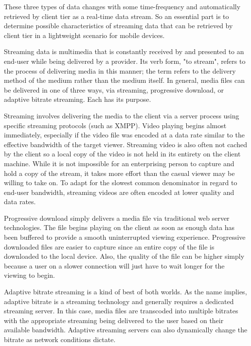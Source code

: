    These three types of data changes with some time-frequency and automatically retrieved by client tier as a real-time data stream. So an essential part is to determine possible characteristics of streaming data that can be retrieved by client tier in a lightweight scenario for mobile devices.

    Streaming data is multimedia that is constantly received by and presented to an end-user while being delivered by a provider. Its verb form, "to stream", refers to the process of delivering media in this manner; the term refers to the delivery method of the medium rather than the medium itself. In general, media files can be delivered in one of three ways, via streaming, progressive download, or adaptive bitrate streaming.  Each has its purpose.

    Streaming involves delivering the media to the client via a server process using specific streaming protocols (such as XMPP).  Video playing begins almost immediately, especially if the video file was encoded at a data rate similar to the effective bandwidth of the target viewer.  Streaming video is also often not cached by the client so a local copy of the video is not held in its entirety on the client machine.  While it is not impossible for an enterprising person to capture and hold a copy of the stream, it takes more effort than the casual viewer may be willing to take on.  To adapt for the slowest common denominator in regard to end-user bandwidth, streaming videos are often encoded at lower quality and data rates.
 
    Progressive download simply delivers a media file via traditional web server technologies.  The file begins playing on the client as soon as enough data has been buffered to provide a smooth uninterrupted viewing experience.  Progressive downloaded files are easier to capture since an entire copy of the file is downloaded to the local device.  Also, the quality of the file can be higher simply because a user on a slower connection will just have to wait longer for the viewing to begin.
  
    Adaptive bitrate streaming is a kind of best of both worlds. As the name implies, adaptive bitrate is a streaming technology and generally requires a dedicated streaming server. In this case, media files are transcoded into multiple bitrates with the appropriate streaming being delivered to the user based on their available bandwidth.  Adaptive streaming servers can also dynamically change the bitrate as network conditions dictate\cite{ilias2013study}.

